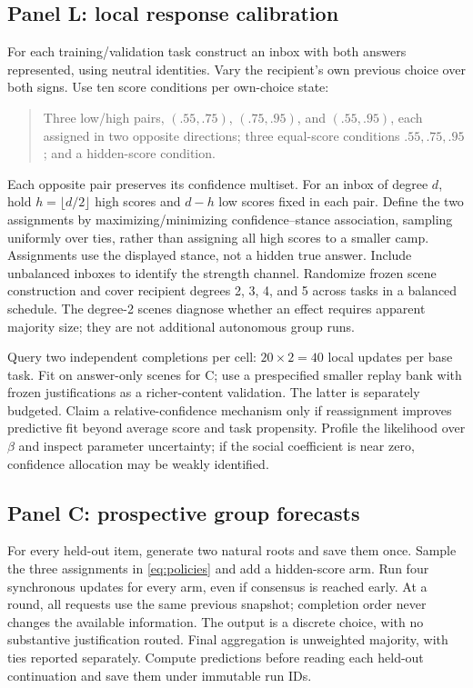 \documentclass[11pt]{article}
\begin{document}
\subsection{Panel L: local response calibration}
For each training/validation task construct an inbox with both answers represented, using neutral identities. Vary the recipient's own previous choice over both signs. Use ten score conditions per own-choice state:
\begin{quote}
Three low/high pairs, $(.55,.75)$, $(.75,.95)$, and $(.55,.95)$, each assigned in two opposite directions; three equal-score conditions $.55,.75,.95$; and a hidden-score condition.
\end{quote}
Each opposite pair preserves its confidence multiset. For an inbox of degree $d$, hold $h=\lfloor d/2\rfloor$ high scores and $d-h$ low scores fixed in each pair. Define the two assignments by maximizing/minimizing confidence--stance association, sampling uniformly over ties, rather than assigning all high scores to a smaller camp. Assignments use the displayed stance, not a hidden true answer. Include unbalanced inboxes to identify the strength channel. Randomize frozen scene construction and cover recipient degrees 2, 3, 4, and 5 across tasks in a balanced schedule. The degree-2 scenes diagnose whether an effect requires apparent majority size; they are not additional autonomous group runs.

Query two independent completions per cell: $20\times2=40$ local updates per base task. Fit on answer-only scenes for C; use a prespecified smaller replay bank with frozen justifications as a richer-content validation. The latter is separately budgeted. Claim a relative-confidence mechanism only if reassignment improves predictive fit beyond average score and task propensity. Profile the likelihood over $\beta$ and inspect parameter uncertainty; if the social coefficient is near zero, confidence allocation may be weakly identified.

\subsection{Panel C: prospective group forecasts}
For every held-out item, generate two natural roots and save them once. Sample the three assignments in \eqref{eq:policies} and add a hidden-score arm. Run four synchronous updates for every arm, even if consensus is reached early. At a round, all requests use the same previous snapshot; completion order never changes the available information. The output is a discrete choice, with no substantive justification routed. Final aggregation is unweighted majority, with ties reported separately. Compute predictions before reading each held-out continuation and save them under immutable run IDs.
\end{document}
